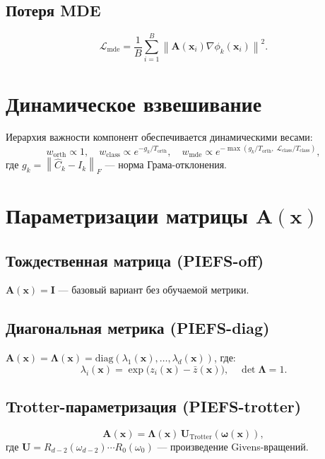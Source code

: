 \documentclass[14pt, a4paper, oneside]{extreport}
\theoremstyle{plain}
\theoremstyle{definition}
\newcommand{\norm}[1]{\left\lVert #1 \right\rVert}
\begin{document}
\subsection{Потеря MDE}
\begin{equation}
  \mathcal{L}_{\text{mde}} = \frac{1}{B}\sum_{i=1}^B \norm{\mathbf{A}(\mathbf{x}_i)\nabla\phi_k(\mathbf{x}_i)}^2.
\end{equation}

\section{Динамическое взвешивание}
\label{sec:weighting}

Иерархия важности компонент обеспечивается динамическими весами:
\begin{equation}
  w_{\text{orth}} \propto 1, \quad
  w_{\text{class}} \propto e^{-g_k / T_{\text{orth}}}, \quad
  w_{\text{mde}} \propto e^{-\max(g_k/T_{\text{orth}},\; \mathcal{L}_{\text{class}}/T_{\text{class}})},
\end{equation}
где $g_k = \norm{\hat{C}_k - I_k}_F$ — норма Грама-отклонения.

\section{Параметризации матрицы \texorpdfstring{$\mathbf{A}(\mathbf{x})$}{A(x)}}
\label{sec:metric}

\subsection{Тождественная матрица (PIEFS-off)}
$\mathbf{A}(\mathbf{x}) = \mathbf{I}$ — базовый вариант без обучаемой метрики.

\subsection{Диагональная метрика (PIEFS-diag)}
$\mathbf{A}(\mathbf{x}) = \boldsymbol{\Lambda}(\mathbf{x}) = \text{diag}(\lambda_1(\mathbf{x}), \ldots, \lambda_d(\mathbf{x}))$, где:
\begin{equation}
  \lambda_i(\mathbf{x}) = \exp\bigl(z_i(\mathbf{x}) - \bar{z}(\mathbf{x})\bigr), \quad \det\boldsymbol{\Lambda} = 1.
\end{equation}

\subsection{Trotter-параметризация (PIEFS-trotter)}
\begin{equation}
  \mathbf{A}(\mathbf{x}) = \boldsymbol{\Lambda}(\mathbf{x})\,\mathbf{U}_{\text{Trotter}}(\boldsymbol{\omega}(\mathbf{x})),
\end{equation}
где $\mathbf{U} = R_{d-2}(\omega_{d-2})\cdots R_0(\omega_0)$ — произведение Givens-вращений.
\end{document}
